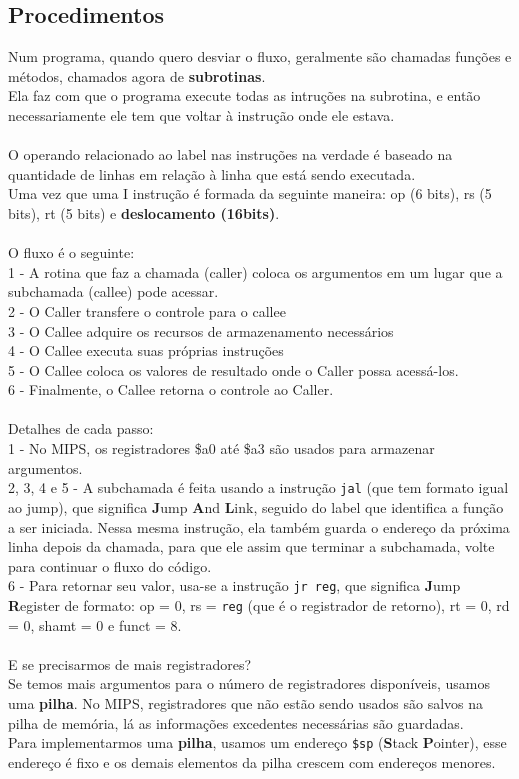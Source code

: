 \documentclass[12pt]{article}
\begin{document}
    \subsection{Procedimentos}
    Num programa, quando quero desviar o fluxo, geralmente são chamadas funções e métodos, chamados agora de \textbf{subrotinas}.
    \\Ela faz com que o programa execute todas as intruções na subrotina, e então necessariamente ele tem que voltar à instrução onde ele estava.
    \\~\\O operando relacionado ao label nas instruções na verdade é baseado na quantidade de linhas em relação à linha que está sendo executada.
    \\Uma vez que uma I instrução é formada da seguinte maneira: op (6 bits), rs (5 bits), rt (5 bits) e \textbf{deslocamento (16bits)}.
    \\~\\O fluxo é o seguinte: \\1 - A rotina que faz a chamada (caller) coloca os argumentos em um lugar que a subchamada (callee) pode acessar.
    \\2 - O Caller transfere o controle para o callee
    \\3 - O Callee adquire os recursos de armazenamento necessários
    \\4 - O Callee executa suas próprias instruções
    \\5 - O Callee coloca os valores de resultado onde o Caller possa acessá-los.
    \\6 - Finalmente, o Callee retorna o controle ao Caller.
    \\~\\Detalhes de cada passo:
    \\1 - No MIPS, os registradores \$a0 até \$a3 são usados para armazenar argumentos.
    \\2, 3, 4 e 5 - A subchamada é feita usando a instrução \verb#jal# (que tem formato igual ao jump), que significa \textbf{J}ump \textbf{A}nd \textbf{L}ink, seguido do label que identifica a função a ser iniciada.
    Nessa mesma instrução, ela também guarda o endereço da próxima linha depois da chamada, para que ele assim que terminar a subchamada, volte para continuar o fluxo do código.
    \\6 - Para retornar seu valor, usa-se a instrução \verb#jr reg#, que significa \textbf{J}ump \textbf{R}egister de formato: op = 0, rs = \verb#reg# (que é o registrador de retorno), rt = 0, rd = 0, shamt = 0 e funct = 8.
    \\~\\E se precisarmos de mais registradores?
    \\Se temos mais argumentos para o número de registradores disponíveis, usamos uma \textbf{pilha}. No MIPS, registradores que não estão sendo usados são salvos na pilha de memória, lá as informações excedentes necessárias
    são guardadas.
    \\Para implementarmos uma \textbf{pilha}, usamos um endereço \verb#$sp# (\textbf{S}tack \textbf{P}ointer), esse endereço é fixo e os demais elementos da pilha crescem com endereços menores.


\end{document}
